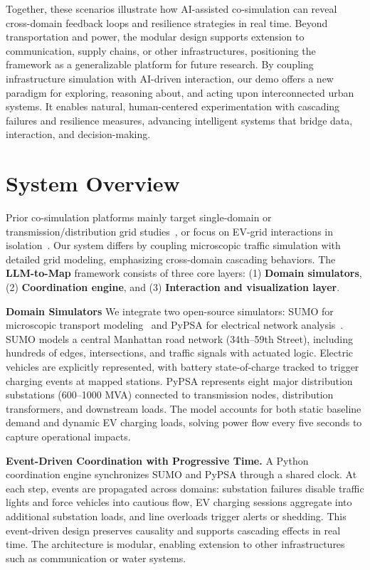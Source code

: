 \documentclass[sigconf,review,nonacm]{acmart}
\begin{document}
Together, these scenarios illustrate how AI-assisted co-simulation can reveal cross-domain feedback loops and resilience strategies in real time. Beyond transportation and power, the modular design supports extension to communication, supply chains, or other infrastructures, positioning the framework as a generalizable platform for future research.
By coupling infrastructure simulation with AI-driven interaction, our demo offers a new paradigm for exploring, reasoning about, and acting upon interconnected urban systems. It enables natural, human-centered experimentation with cascading failures and resilience measures, advancing intelligent systems that bridge data, interaction, and decision-making.

\section{System Overview}
Prior co-simulation platforms mainly target single-domain or transmission/distribution grid studies~\cite{mihal2022smart}, or focus on EV-grid interactions in isolation~\cite{balogun2023ev}. Our system differs by coupling microscopic traffic simulation with detailed grid modeling, emphasizing cross-domain cascading behaviors.
The \textbf{LLM-to-Map} framework consists of three core layers: (1) \textbf{Domain simulators}, (2) \textbf{Coordination engine}, and (3) \textbf{Interaction and visualization layer}.

\noindent\textbf{Domain Simulators}
We integrate two open-source simulators: SUMO for microscopic transport modeling~\cite{lopez2018sumo} and PyPSA for electrical network analysis~\cite{brown2018pypsa}. SUMO models a central Manhattan road network (34th–59th Street), including hundreds of edges, intersections, and traffic signals with actuated logic. Electric vehicles are explicitly represented, with battery state-of-charge tracked to trigger charging events at mapped stations. PyPSA represents eight major distribution substations (600--1000 MVA) connected to transmission nodes, distribution transformers, and downstream loads. The model accounts for both static baseline demand and dynamic EV charging loads, solving power flow every five seconds to capture operational impacts.

\noindent\textbf{Event-Driven Coordination with Progressive Time.}
A Python coordination engine synchronizes SUMO and PyPSA through a shared clock. At each step, events are propagated across domains: substation failures disable traffic lights and force vehicles into cautious flow, EV charging sessions aggregate into additional substation loads, and line overloads trigger alerts or shedding. This event-driven design preserves causality and supports cascading effects in real time. The architecture is modular, enabling extension to other infrastructures such as communication or water systems.
\end{document}
